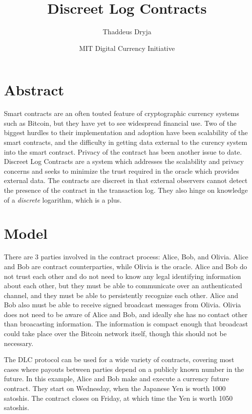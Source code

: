 \documentclass[11pt]{article}
\title{\textbf{Discreet Log Contracts}}
\author{Thaddeus Dryja}
\date{MIT Digital Currency Initiative}
\begin{document}
\maketitle

\section*{Abstract}

Smart contracts \cite{szabo1997formalizing} are an often touted feature of cryptographic currency systems such as Bitcoin, but they have yet to see widespread financial use.  Two of the biggest hurdles to their implementation and adoption have been scalability of the smart contracts, and the difficulty in getting data external to the curency system into the smart contract.  Privacy of the contract has been another issue to date.  Discreet Log Contracts are a system which addresses the scalability and privacy concerns and seeks to minimize the trust required in the oracle which provides external data.  The contracts are discreet in that external observers cannot detect the presence of the contract in the transaction log.  They also hinge on knowledge of a \textit{discrete} logarithm, which is a plus.


\section*{Model}

There are 3 parties involved in the contract process: Alice, Bob, and Olivia.  Alice and Bob are contract counterparties, while Olivia is the oracle.  Alice and Bob do not trust each other and do not need to know any legal identifying information about each other, but they must be able to communicate over an authenticated channel, and they must be able to persistently recognize each other.  Alice and Bob also must be able to receive signed broadcast messages from Olivia.  Olivia does not need to be aware of Alice and Bob, and ideally she has no contact other than broacasting information.  The information is compact enough that broadcast could take place over the Bitcoin network itself, though this should not be necessary.

The DLC protocol can be used for a wide variety of contracts, covering most cases where payouts between parties depend on a publicly known number in the future.  In this example, Alice and Bob make and execute a currency future contract.  They start on Wednesday, when the Japanese Yen is worth 1000 satoshis.  The contract closes on Friday, at which time the Yen is worth 1050 satoshis.
\end{document}
